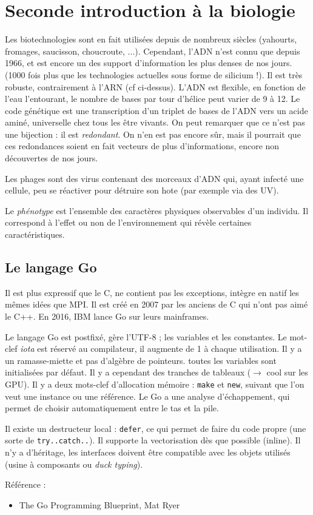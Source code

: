 \documentclass{article}
\begin{document}
\section{Seconde introduction à la biologie}
Les biotechnologies sont en fait utilisées depuis de nombreux siècles (yahourts, fromages, saucisson, choucroute, ...). Cependant, l'ADN n'est connu que depuis 1966, et est encore un des support d'information les plus denses de nos jours. (1000 fois plus que les technologies actuelles sous forme de silicium !). Il est très robuste, contrairement à l'ARN (cf ci-dessus). L'ADN est flexible, en fonction de l'eau l'entourant, le nombre de bases par tour d'hélice peut varier de 9 à 12. Le code génétique est une transcription d'un triplet de bases de l'ADN vers un acide aminé, universelle chez tous les être vivants. On peut remarquer que ce n'est pas une bijection : il est \emph{redondant}. On n'en est pas encore sûr, mais il pourrait que ces redondances soient en fait vecteurs de plus d'informations, encore non découvertes de nos jours.


Les phages sont des virus contenant des morceaux d'ADN qui, ayant infecté une cellule, peu se réactiver pour détruire son hote (par exemple via des UV).


Le \emph{phénotype} est l'ensemble des caractères physiques observables d'un individu. Il correspond à l'effet ou non de l'environnement qui révèle certaines caractéristiques.

\subsection*{Le langage Go}
Il est plus expressif que le C, ne contient pas les exceptions, intègre en natif les mêmes idées que MPI. Il est créé en 2007 par les anciens de C qui n'ont pas aimé le C++. En 2016, IBM lance Go sur leurs mainframes.


Le langage Go est postfixé, gère l'UTF-8 ; les variables et les constantes. Le mot-clef \emph{iota} est réservé au compilateur, il augmente de 1 à chaque utilisation. Il y a un ramasse-miette et pas d'algèbre de pointeurs. toutes les variables sont initialisées par défaut. Il y a cependant des tranches de tableaux ($\to$ cool sur les GPU). Il y a deux mots-clef d'allocation mémoire : \texttt{make} et \texttt{new}, suivant que l'on veut une instance ou une référence. Le Go a une analyse d'échappement, qui permet de choisir automatiquement entre le tas et la pile.


Il existe un destructeur local : \texttt{defer}, ce qui permet de faire du code propre (une sorte de \texttt{try..catch..}). Il supporte la vectorisation dès que possible (inline). Il n'y a d'héritage, les interfaces doivent être compatible avec les objets utilisés (usine à composants ou \emph{duck typing}).

Référence :
\begin{itemize}
\item The Go Programming Blueprint, Mat Ryer
\end{itemize}
\end{document}
